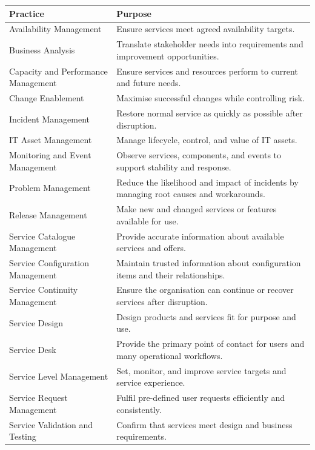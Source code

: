 \documentclass[
  letterpaper,
  DIV=11,
  numbers=noendperiod]{scrartcl}
\begin{document}
\begin{longtable}[]{@{}
  >{\raggedright\arraybackslash}p{}
  >{\raggedright\arraybackslash}p{}@{}}
\toprule\noalign{}
\begin{minipage}[b]{\linewidth}\raggedright
Practice
\end{minipage} & \begin{minipage}[b]{\linewidth}\raggedright
Purpose
\end{minipage} \\
\midrule\noalign{}
\endhead
\bottomrule\noalign{}
\endlastfoot
Availability Management & Ensure services meet agreed availability
targets. \\
Business Analysis & Translate stakeholder needs into requirements and
improvement opportunities. \\
Capacity and Performance Management & Ensure services and resources
perform to current and future needs. \\
Change Enablement & Maximise successful changes while controlling
risk. \\
Incident Management & Restore normal service as quickly as possible
after disruption. \\
IT Asset Management & Manage lifecycle, control, and value of IT
assets. \\
Monitoring and Event Management & Observe services, components, and
events to support stability and response. \\
Problem Management & Reduce the likelihood and impact of incidents by
managing root causes and workarounds. \\
Release Management & Make new and changed services or features available
for use. \\
Service Catalogue Management & Provide accurate information about
available services and offers. \\
Service Configuration Management & Maintain trusted information about
configuration items and their relationships. \\
Service Continuity Management & Ensure the organisation can continue or
recover services after disruption. \\
Service Design & Design products and services fit for purpose and
use. \\
Service Desk & Provide the primary point of contact for users and many
operational workflows. \\
Service Level Management & Set, monitor, and improve service targets and
service experience. \\
Service Request Management & Fulfil pre-defined user requests
efficiently and consistently. \\
Service Validation and Testing & Confirm that services meet design and
business requirements. \\
\end{longtable}
\end{document}

